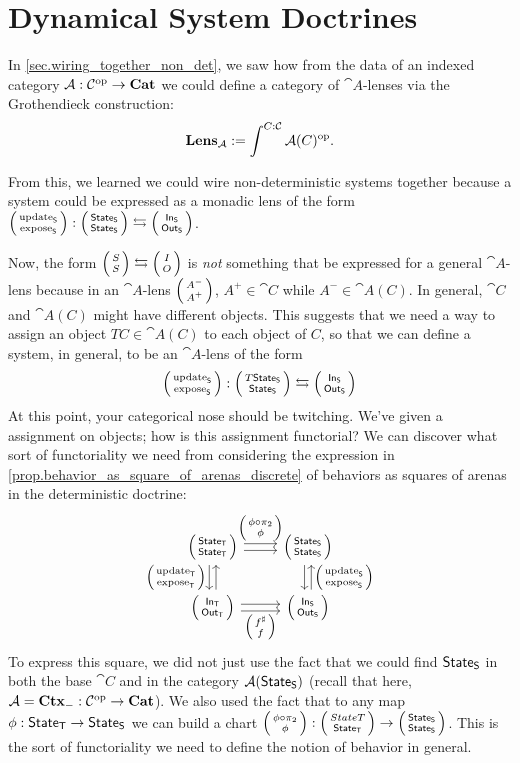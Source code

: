 \documentclass[DynamicalBook]{subfiles}
\begin{document}
\section{Dynamical System Doctrines}\label{sec.doctrines}

In \cref{sec.wiring_together_non_det}, we saw how from the data of an indexed
category $\mathcal{A} : \mathcal{C}^{\textnormal{op}} \to \textbf{Cat}$ we could define a category of $\cat{A}$-lenses via the Grothendieck
construction:
$$\textbf{Lens}_{\mathcal{A}} := \int^{C : \mathcal{C}}\mathcal{A}(C)^{\textnormal{op}}.$$

From this, we learned we could wire non-deterministic systems together because a
system could be expressed as a monadic lens of the form
$\lens{\update{S}}{\expose{S}} : \lens{\State{S}}{\State{S}} \fromto
\lens{\In{S}}{\Out{S}}$. 

Now, the form $\lens{S}{S} \fromto \lens{I}{O}$ is \emph{not} something that be
expressed for a general $\cat{A}$-lens because in an $\cat{A}$-lens
$\lens{A^-}{A^+}$, $A^+ \in \cat{C}$ while $A^- \in \cat{A}(C)$. In general,
$\cat{C}$ and $\cat{A}(C)$ might have different objects. This suggests that we need
a way to assign an object $TC \in \cat{A}(C)$ to each object of $C$, so that we
can define a system, in general, to be an $\cat{A}$-lens of the form 
\[
\lens{\update{S}}{\expose{S}} : \lens{T\State{S}}{\State{S}} \fromto
\lens{\In{S}}{\Out{S}}
\]
At this point, your categorical nose should be twitching. We've given a
assignment on objects; how is this assignment functorial? We can discover what
sort of functoriality we need from considering the expression in \cref{prop.behavior_as_square_of_arenas_discrete} of behaviors as
squares of arenas in the deterministic doctrine:
\[
    \begin{tikzcd}
      \lens{\State{T}}{\State{T}} \ar[r, shift left, "\lens{\phi \circ
        \pi_2}{\phi}"] \ar[r, shift right] \ar[d, shift right,
      "\lens{\update{T}}{\expose{T}}"'] \ar[d, shift left, leftarrow] &
      \lens{\State{S}}{\State{S}} \ar[d, shift left, leftarrow,
      "\lens{\update{S}}{\expose{S}}"] \ar[d, shift right]\\
      \lens{\In{T}}{\Out{T}} \ar[r, shift right, "\lens{f^{\sharp}}{f}"'] \ar[r,
      shift left] & \lens{\In{S}}{\Out{S}}
    \end{tikzcd}
  \]
To express this square, we did not just use the fact that we could find $\mathsf{State}_{\mathsf{S}}$
in both the base $\cat{C}$ and in the category $\mathcal{A}(\mathsf{State}_{\mathsf{S}})$ (recall that
here, $\mathcal{A} = \textbf{Ctx}_{-} : \mathcal{C}^{\textnormal{op}} \to \textbf{Cat}$). We also used the fact
that to any map $\phi : \mathsf{State}_{\mathsf{T}} \to \mathsf{State}_{\mathsf{S}}$ we can build a chart
$\lens{\phi \circ \pi_2}{\phi} : \lens{State{T}}{\State{T}} \to
\lens{\State{S}}{\State{S}}$. This is the sort of functoriality we need to
define the notion of behavior in general.
\end{document}
